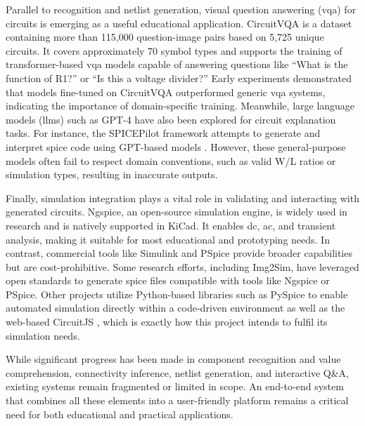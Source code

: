 Parallel to recognition and netlist generation, visual question answering (\gls{vqa}) for circuits is emerging as a useful educational application. CircuitVQA is a dataset containing more than 115,000 question-image pairs based on 5,725 unique circuits. It covers approximately 70 symbol types and supports the training of transformer-based \gls{vqa} models capable of answering questions like ``What is the function of R1?'' or ``Is this a voltage divider?'' Early experiments demonstrated that models fine-tuned on CircuitVQA outperformed generic \gls{vqa} systems, indicating the importance of domain-specific training. Meanwhile, large language models (\glspl{llm}) such as GPT-4 have also been explored for circuit explanation tasks. For instance, the SPICEPilot framework attempts to generate and interpret \gls{spice} code using GPT-based models \cite{vungarala2024spicepilot}. However, these general-purpose models often fail to respect domain conventions, such as valid W/L ratios or simulation types, resulting in inaccurate outputs.

Finally, simulation integration plays a vital role in validating and interacting with generated circuits. Ngspice, an open-source simulation engine, is widely used in research and is natively supported in KiCad. It enables \gls{dc}, \gls{ac}, and transient analysis, making it suitable for most educational and prototyping needs. In contrast, commercial tools like Simulink and PSpice provide broader capabilities but are cost-prohibitive. Some research efforts, including Img2Sim, have leveraged open standards to generate \gls{spice} files compatible with tools like Ngspice or PSpice. Other projects utilize Python-based libraries such as PySpice to enable automated simulation directly within a code-driven environment as well as the web-based CircuitJS \cite{falstad2026}, which is exactly how this project intends to fulfil its simulation needs.

While significant progress has been made in component recognition and value comprehension, connectivity inference, netlist generation, and interactive Q\&A, existing systems remain fragmented or limited in scope. An end-to-end system that combines all these elements into a user-friendly platform remains a critical need for both educational and practical applications.